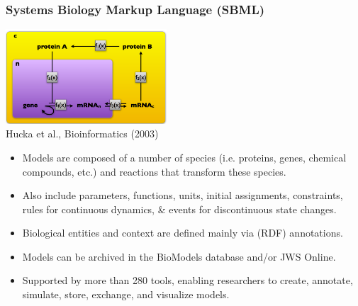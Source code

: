 \documentclass{beamer}
\begin{document}
\begin{frame}\frametitle{Systems Biology Markup Language (SBML)}
\begin{center}
\includegraphics[width=0.45\textwidth]{figs/SBML}\\
Hucka et al., Bioinformatics (2003)
\end{center}
\begin{itemize}
\item Models are composed of a number of species (i.e. proteins, genes, chemical compounds, etc.) and reactions that transform these species.
\item Also include parameters, functions, units, initial assignments, constraints, rules for continuous dynamics, \& events for discontinuous state changes.
\item Biological entities and context are defined mainly via (RDF) annotations.
\item Models can be archived in the BioModels database and/or JWS Online.
\item Supported by more than 280 tools, enabling researchers to create, annotate, simulate, store, exchange, and visualize models.
\end{itemize}
\end{frame}
\end{document}
